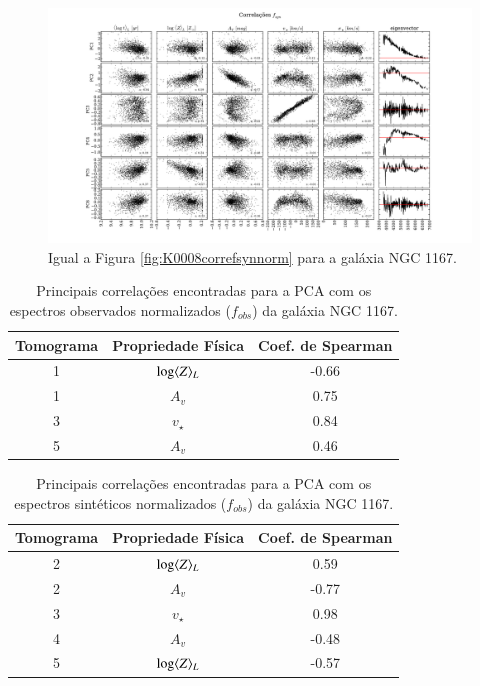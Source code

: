 \begin{figure}
    \includegraphics[width=1.2\textwidth, angle=-90]{figuras/K0119-correl-f_syn_norm-PCvsPhys.pdf}
	\caption[Correlações PCs vs. par\^ametros f\'isicos - $f_{syn}$ - NGC 1167.]
	{Igual a Figura \ref{fig:K0008correfsynnorm} para a galáxia NGC 1167.}
    \label{fig:K0119correfsynnorm}
\end{figure}

\begin{table}
	\caption[Principais correlações - $f_{obs}$ - NGC 1167]
	{Principais correlações encontradas para a PCA com os espectros observados normalizados ($f_{obs}$) da galáxia NGC
	1167.}
	\begin{tabular}{c c c}
		Tomograma & Propriedade Física & Coef. de Spearman \\ 
		\midrule
		1 & $\log \meanL{Z}$ & -0.66 \\
		1 & $A_v$            & 0.75 \\
		3 & $v_\star$        & 0.84 \\
		5 & $A_v$            & 0.46 \\
		\end{tabular}
	\label{tab:K0119tabcorreobs}
\end{table}

\begin{table}
	\caption[Principais correlações - $f_{syn}$ - NGC 1167]
	{Principais correlações encontradas para a PCA com os espectros sintéticos normalizados ($f_{obs}$) da galáxia NGC
	1167.}
	\begin{tabular}{c c c}
		Tomograma & Propriedade Física & Coef. de Spearman \\ 
		\midrule
		2 & $\log \meanL{Z}$ & 0.59 \\
		2 & $A_v$            & -0.77 \\
		3 & $v_\star$        & 0.98 \\
		4 & $A_v$            & -0.48 \\
		5 & $\log \meanL{Z}$ & -0.57 \\
		\end{tabular}
	\label{tab:K0119tabcorresyn}
\end{table}

